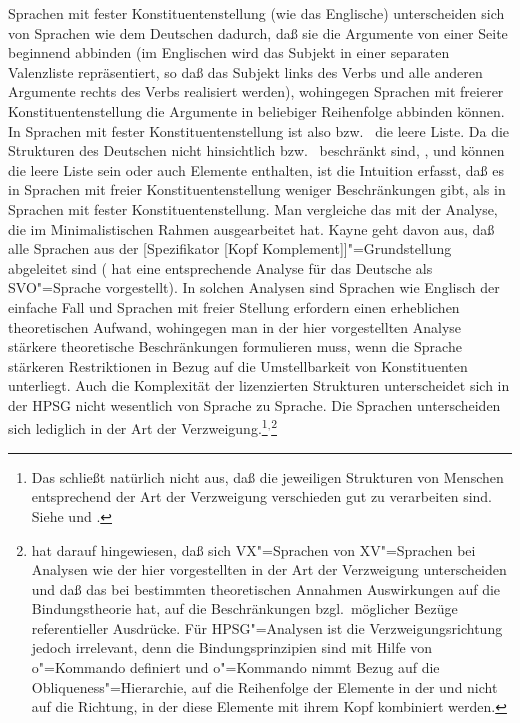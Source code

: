 Sprachen mit fester
Konstituentenstellung (wie das
Englische) unterscheiden sich von Sprachen wie dem Deutschen dadurch, daß sie die
Argumente von einer Seite beginnend abbinden (im Englischen wird das Subjekt in einer separaten
Valenzliste repräsentiert, so daß das Subjekt links des Verbs und alle anderen Argumente rechts des
Verbs realisiert werden), wohingegen Sprachen mit freierer Konstituentenstellung die Argumente
in beliebiger Reihenfolge abbinden können. In Sprachen mit fester Konstituentenstellung ist also
 bzw.\  die leere Liste. Da die Strukturen des Deutschen nicht hinsichtlich 
bzw.\  beschränkt sind, \dash,  und  können die leere Liste sein oder auch
Elemente enthalten, ist die Intuition erfasst, daß es in Sprachen mit freier Konstituentenstellung
weniger Beschränkungen gibt, als in Sprachen mit fester Konstituentenstellung. Man vergleiche das
mit der Analyse, die \citet{Kayne94a-u} im Minimalistischen Rahmen ausgearbeitet hat. Kayne geht
davon aus, daß alle Sprachen aus der [Spezifikator [Kopf Komplement]]"=Grundstellung abgeleitet sind
(\citet{Laenzlinger2004a} hat eine entsprechende Analyse für das Deutsche als
SVO"=Sprache vorgestellt). In solchen Analysen sind Sprachen wie
Englisch der einfache Fall und Sprachen mit freier Stellung erfordern einen erheblichen
theoretischen Aufwand, wohingegen man in der hier vorgestellten Analyse stärkere theoretische
Beschränkungen formulieren muss, wenn die Sprache stärkeren Restriktionen in Bezug auf die
Umstellbarkeit von Konstituenten unterliegt. Auch die Komplexität der lizenzierten Strukturen
unterscheidet sich in der HPSG nicht wesentlich von Sprache zu Sprache. Die Sprachen unterscheiden
sich lediglich in der Art der Verzweigung.\footnote{ 
Das schließt natürlich nicht aus, daß die
  jeweiligen Strukturen von Menschen entsprechend der Art der Verzweigung verschieden gut zu
  verarbeiten sind. Siehe  und \citet[Abschnitt~11.3]{MuellerGTBuch1}.
}$^,$\footnote{%
\citet[]{Haider97c} hat darauf hingewiesen, daß sich VX"=Sprachen von XV"=Sprachen bei
Analysen wie der hier vorgestellten in der Art der Verzweigung unterscheiden und daß das bei bestimmten
theoretischen Annahmen Auswirkungen auf die Bindungstheorie hat, \dash auf die
Beschränkungen bzgl.\ möglicher Bezüge referentieller Ausdrücke. Für HPSG"=Analysen
ist die Verzweigungsrichtung jedoch irrelevant, denn die Bindungsprinzipien sind mit Hilfe von
o"=Kommando definiert \citep[Kapitel~6]{ps2} und o"=Kommando nimmt Bezug auf die
Obliqueness"=Hierarchie, \dash auf die Reihenfolge der Elemente in der \subcatl und nicht auf die
Richtung, in der diese Elemente mit ihrem Kopf kombiniert werden. 
}


